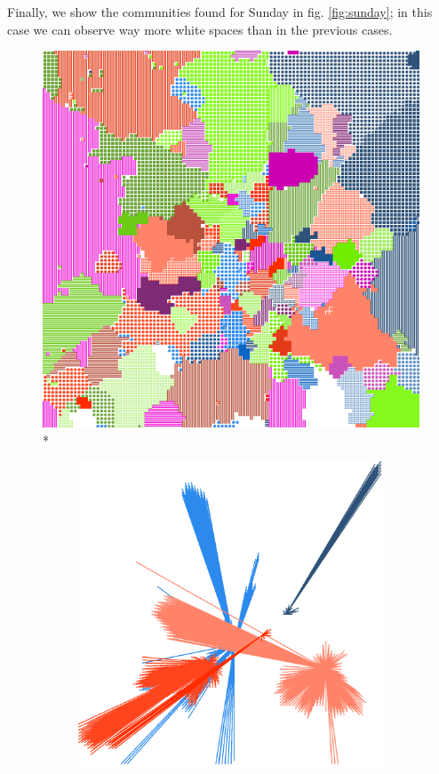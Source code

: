 \documentclass[12pt,a4paper]{article}
\begin{document}
Finally, we show the communities found for Sunday in fig. \ref{fig:sunday}; in this case we can observe way more white spaces than in the previous cases.

\begin{figure}[H]
\centering
\includegraphics[width=\linewidth]{weekDef/7Sun.png}
\\*
\begin{subfigure}[b]{0.3\textwidth}
\includegraphics[width=\textwidth]{weekDef/edges-7Sun-big.png}

\end{subfigure}
\end{figure}
\end{document}
